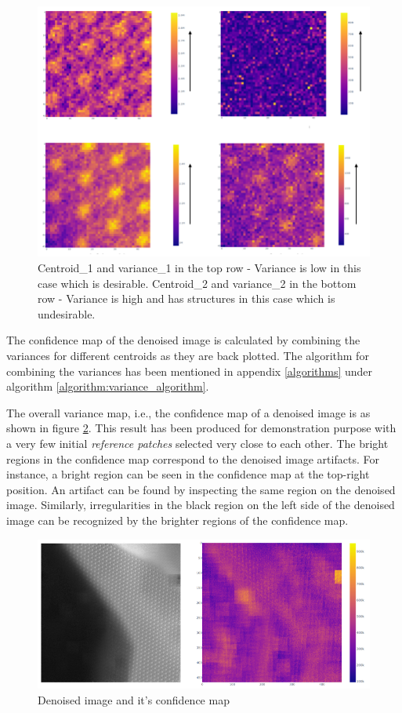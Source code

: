 \documentclass[fleqn,10pt]{wlscirep}
\begin{document}
\begin{figure}[H]
	\centering
	\includegraphics[scale=0.6]{./imgs/variance_of_centroid.png}
	\caption[Centroid and variances of clusters]{Centroid\_1 and variance\_1 in the top row - Variance is low in this case which is desirable. Centroid\_2 and
		variance\_2 in the bottom row - Variance is high and has structures in this case which is undesirable.}
	\label{fig:variance_of_centroid}
\end{figure}

The confidence map of the denoised image is calculated by combining the variances for different centroids as they are back plotted. The algorithm \cite{chan1982updating} for combining the variances has been mentioned in appendix \ref{algorithms} under algorithm \ref{algorithm:variance_algorithm}.

The overall variance map, i.e., the confidence map of a denoised image is as shown in figure \ref{fig:confidence_map}. This result has been produced for demonstration purpose with a very few initial \textit{reference patches} selected very close to each other. The bright regions in the confidence map correspond to the denoised image artifacts. For instance, a bright region can be seen in the confidence map at the top-right position. An artifact can be found by inspecting the same region on the denoised image. Similarly, irregularities in the black region on the left side of the denoised image can be recognized by the brighter regions of the confidence map.

\begin{figure}[H]
	\centering
	\includegraphics[scale=0.7]{./imgs/confidence_map.png}
	\caption{Denoised image and it's confidence map}
	\label{fig:confidence_map}
\end{figure}
\end{document}
